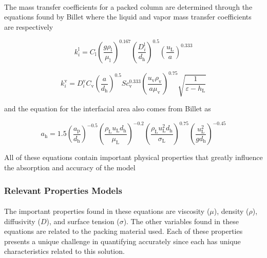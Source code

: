 \documentclass[12pt, letterpaper]{article}
\begin{document}
\paragraph{}
The mass transfer coefficients for a packed column are determined through the equations found by Billet \cite{Billet1999} where the liquid and vapor mass transfer coefficients are respectively

\begin{equation}
k_i^{\mathrm{l}}=C_{\mathrm{l}}\left(\frac{g \rho_{\mathrm{l}}}{\mu_{\mathrm{l}}}\right)^{0.167}\left(\frac{D_i^{\mathrm{l}}}{d_{\mathrm{h}}}\right)^{0.5}\left(\frac{u_{\mathrm{L}}}{a}\right)^{0.333}
\end{equation}

\begin{equation}
k_i^{\mathrm{v}}=D_i^{\mathrm{v}} C_{\mathrm{v}}\left(\frac{a}{d_{\mathrm{h}}}\right)^{0.5} S c_{\mathrm{v}}^{0.333}\left(\frac{u_{\mathrm{v}} \rho_{\mathrm{v}}}{a \mu_{\mathrm{v}}}\right)^{0.75} \sqrt{\frac{1}{\varepsilon-h_{\mathrm{L}}}}
\end{equation}

and the equation for the interfacial area also comes from Billet \cite{Billet1999} as

\begin{equation}
a_{\mathrm{h}}=1.5\left(\frac{a_{\mathrm{p}}}{d_{\mathrm{h}}}\right)^{-0.5}\left(\frac{\rho_{\mathrm{L}} u_{\mathrm{L}} d_{\mathrm{h}}}{\mu_{\mathrm{L}}}\right)^{-0.2}\left(\frac{\rho_{\mathrm{L}} u_{\mathrm{L}}^2 d_{\mathrm{h}}}{\sigma_{\mathrm{L}}}\right)^{0.75}\left(\frac{u_{\mathrm{L}}^2}{g d_{\mathrm{h}}}\right)^{-0.45}
\end{equation}

All of these equations contain important physical properties that greatly influence the absorption and accuracy of the model

\subsubsection{Relevant Properties Models}

\paragraph{}
The important properties found in these equations are viscosity ($\mu$), density ($\rho$),  diffusivity ($D$), and surface tension ($\sigma $). The other variables found in these equations are related to the packing material used. Each of these properties presents a unique challenge in quantifying accurately since each has unique characteristics related to this solution. 
\end{document}

